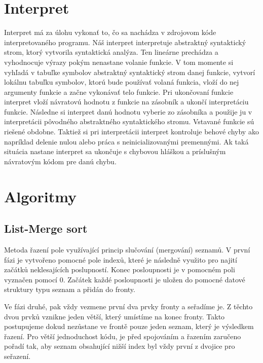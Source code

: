 \documentclass[12pt,a4paper]{report}
\begin{document}
\section{Interpret}
Interpret má za úlohu vykonať to, čo sa nachádza v zdrojovom kóde interpretovaného programu. Náš interpret interpretuje abstraktný syntaktický strom, ktorý vytvorila syntaktická analýza. Ten lineárne prechádza a vyhodnocuje výrazy pokým nenastane volanie funkcie. V tom momente si vyhľadá v tabuľke symbolov abstraktný syntaktický strom danej funkcie, vytvorí lokálnu tabuľku symbolov, ktorú bude používať volaná funkcia, vloží do nej argumenty funkcie a začne vykonávať telo funkcie. Pri ukončovaní funkcie interpret vloží návratovú hodnotu z funkcie na zásobník a ukončí interpretáciu funkcie. Následne si interpret danú hodnotu vyberie zo zásobníka a použije ju v interpretácii pôvodného abstraktného syntaktického stromu. Vstavané funkcie sú riešené obdobne. Taktiež si pri interpretácii interpret kontroluje behové chyby ako napríklad delenie nulou alebo práca s neinicializovanými premennými. Ak taká situácia nastane interpret sa ukončuje s chybovou hláškou a príslušným návratovým kódom pre danú chybu.


\section{Algoritmy}
\subsection{List-Merge sort}
\par Metoda řazení pole využívající princip slučování (mergování) seznamů.
V první fázi je vytvořeno pomocné pole indexů, které je následně využito pro najití začátků neklesajících poslupností. Konec posloupnosti je v pomocném poli vyznačen pomocí 0. Začátek každé posloupnosti je uložen do pomocné datové struktury typu seznam a přidán do fronty.

\par Ve fázi druhé, pak vždy vezmene první dva prvky fronty a seřadíme je. Z těchto dvou prvků vznikne jeden větší, který umístíme na konec fronty. Takto postupujeme dokud nezůstane ve frontě pouze jeden seznam, který je výsledkem řazení. Pro větší jednoduchost kódu, je před spojováním a řazením zaručeno pořadí tak, aby seznam obsahující nižší index byl vždy první z dvojice pro seřazení.
\end{document}
